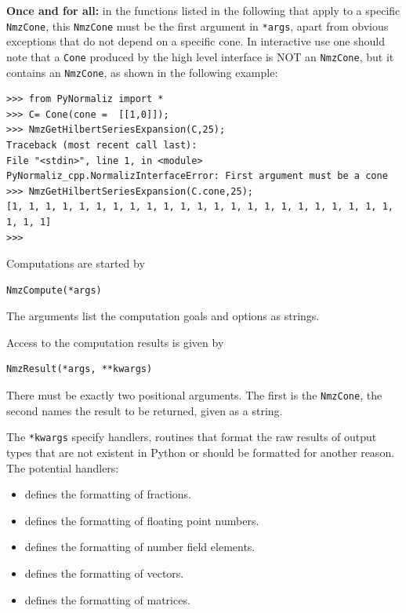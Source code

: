 \begin{small}
\textbf{Once and for all:} in the functions listed in the following that apply to a specific \verb|NmzCone|, this \verb|NmzCone| must be the first argument in \verb|*args|, apart from obvious exceptions that do not depend on a specific cone. In interactive use one should note that a \verb*|Cone| produced by the high level interface is NOT an \verb*|NmzCone|, but it contains an \verb*|NmzCone|, as shown in the following example:
\begin{Verbatim}
>>> from PyNormaliz import *
>>> C= Cone(cone =  [[1,0]]);
>>> NmzGetHilbertSeriesExpansion(C,25);
Traceback (most recent call last):
File "<stdin>", line 1, in <module>
PyNormaliz_cpp.NormalizInterfaceError: First argument must be a cone
>>> NmzGetHilbertSeriesExpansion(C.cone,25);
[1, 1, 1, 1, 1, 1, 1, 1, 1, 1, 1, 1, 1, 1, 1, 1, 1, 1, 1, 1, 1, 1, 1, 1, 1, 1]
>>> 
\end{Verbatim}

Computations are started by
\begin{Verbatim}
NmzCompute(*args)
\end{Verbatim}
The arguments list the computation goals and options as strings.

Access to the computation results is given by
\begin{Verbatim}
NmzResult(*args, **kwargs)
\end{Verbatim}
There must be exactly two positional arguments. The first is the \verb|NmzCone|, the second names the result to be returned, given as a string.

The \verb|*kwargs| specify handlers, routines that format the raw results of output types that are not existent in Python or should be formatted for another reason. The potential handlers:
\begin{itemize}
	\item[\texttt{RatHandler}] defines the formatting of fractions.
	
	\item[\texttt{FloatHandler}] defines the formatting of floating point numbers.
	
	\item[\texttt{NumberfieldElementHandler}] defines the formatting of number field elements.
	
	\item[\texttt{VectorHandler}] defines the formatting of vectors.
	
	\item[\texttt{MatrixHandler}] defines the formatting of matrices.
\end{itemize}


\end{small}
